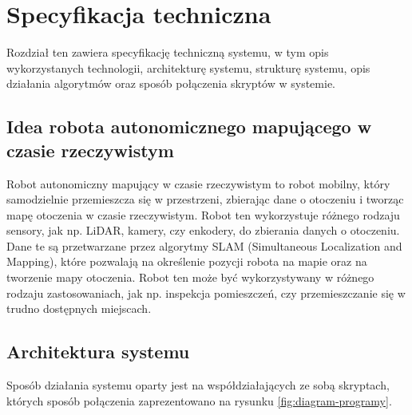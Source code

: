 \documentclass[a4paper,twoside,12pt]{book}
\begin{document}
%


\chapter{Specyfikacja techniczna}
\label{ch:05}
Rozdział ten zawiera specyfikację techniczną systemu, w tym opis wykorzystanych technologii, architekturę systemu, strukturę systemu, opis działania algorytmów oraz sposób połączenia skryptów w systemie.
\section{Idea robota autonomicznego mapującego w czasie rzeczywistym} 
Robot autonomiczny mapujący w czasie rzeczywistym to robot mobilny, który samodzielnie przemieszcza się w przestrzeni, zbierając dane o otoczeniu i tworząc mapę otoczenia w czasie rzeczywistym. Robot ten wykorzystuje różnego rodzaju sensory, jak np. LiDAR, kamery, czy enkodery, do zbierania danych o otoczeniu. Dane te są przetwarzane przez algorytmy SLAM (Simultaneous Localization and Mapping), które pozwalają na określenie pozycji robota na mapie oraz na tworzenie mapy otoczenia. Robot ten może być wykorzystywany w różnego rodzaju zastosowaniach, jak np. inspekcja pomieszczeń, czy przemieszczanie się w trudno dostępnych miejscach.
\newpage
\section{Architektura systemu}
Sposób działania systemu oparty jest na współdziałających ze sobą skryptach, których sposób połączenia zaprezentowano na rysunku \ref{fig:diagram-programy}.
\end{document}

